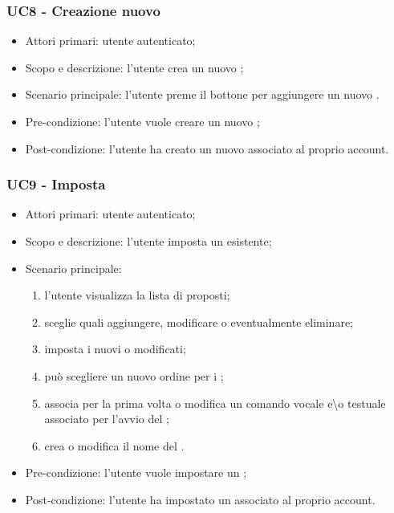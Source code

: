 
\subsubsection{UC8 - Creazione nuovo }
\begin{itemize}
	\item  Attori primari: utente autenticato;
	\item  Scopo e descrizione: l'utente crea un nuovo ;
	\item  Scenario principale: l'utente preme il bottone per aggiungere un nuovo .
	\item  Pre-condizione: l'utente vuole creare un nuovo ;
	\item  Post-condizione: l'utente ha creato un nuovo  associato al proprio account.
\end{itemize}
\subsubsection{UC9 - Imposta }
\begin{itemize}
	\item  Attori primari: utente autenticato;
	\item  Scopo e descrizione: l'utente imposta un  esistente;
	\item  Scenario principale:  
	\begin{enumerate}
		\item l'utente visualizza la lista di  proposti;
		\item sceglie quali  aggiungere, modificare o eventualmente eliminare;
		\item imposta i  nuovi o modificati;
		\item può scegliere un nuovo ordine per i ;
		\item associa per la prima volta o modifica un comando vocale e\textbackslash o testuale associato per l'avvio del ;
		\item crea o modifica il nome del .
	\end{enumerate}
	\item  Pre-condizione: l'utente vuole impostare un ;
	\item  Post-condizione: l'utente ha impostato un  associato al proprio account.
\end{itemize}
